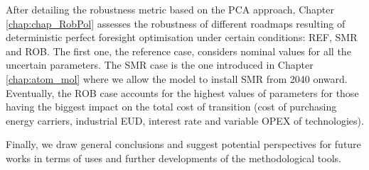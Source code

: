 After detailing the robustness metric based on the \gls{PCA} approach, Chapter \ref{chap:chap_RobPol} assesses the robustness of different roadmaps resulting of deterministic perfect foresight optimisation under certain conditions: REF, SMR and ROB. The first one, the reference case, considers nominal values for all the uncertain parameters. The SMR case is the one introduced in Chapter \ref{chap:atom_mol} where we allow the model to install \gls{SMR} from 2040 onward. Eventually, the ROB case accounts for the highest values of parameters for those having the biggest impact on the total cost of transition (\ie cost of purchasing energy carriers, industrial \gls{EUD}, interest rate and variable \gls{OPEX} of technologies).

Finally, we draw general conclusions and suggest potential perspectives for future works in terms of uses and further developments of the methodological tools.